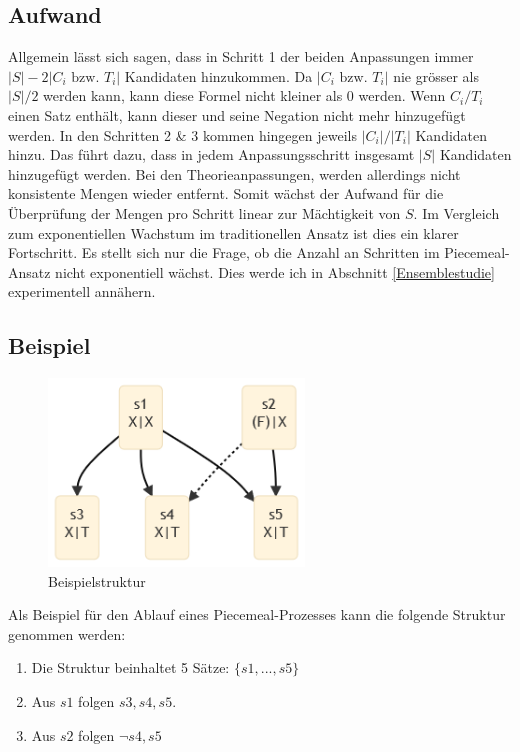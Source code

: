 \documentclass{article}
\begin{document}
\subsection{Aufwand}
Allgemein lässt sich sagen, dass in Schritt 1 der beiden Anpassungen immer $\lvert S \rvert - 2\lvert C_i \text{ bzw. } T_i \rvert$ Kandidaten hinzukommen. Da $\lvert C_i \text{ bzw. } T_i \rvert$ nie grösser als $\lvert S \rvert/2$ werden kann, kann diese Formel nicht kleiner als 0 werden. Wenn $C_i/T_i$ einen Satz enthält, kann dieser und seine Negation nicht mehr hinzugefügt werden. In den Schritten 2 \& 3 kommen hingegen jeweils $\lvert C_i \rvert / \lvert T_i \rvert$ Kandidaten hinzu. Das führt dazu, dass in jedem Anpassungsschritt insgesamt $\lvert S \rvert$ Kandidaten hinzugefügt werden. Bei den Theorieanpassungen, werden allerdings nicht konsistente Mengen wieder entfernt. Somit wächst der Aufwand für die Überprüfung der Mengen pro Schritt linear zur Mächtigkeit von $S$. Im Vergleich zum exponentiellen Wachstum im traditionellen Ansatz ist dies ein klarer Fortschritt. Es stellt sich nur die Frage, ob die Anzahl an Schritten im Piecemeal-Ansatz nicht exponentiell wächst. Dies werde ich in Abschnitt \ref{Ensemblestudie} experimentell annähern.

\subsection{Beispiel}
\begin{figure}[ht]
  \centering
  \includegraphics[width=\textwidth,height=5cm,keepaspectratio]{images/reduced_classical.png}
  \caption{Beispielstruktur\label{fig:classset-initial1}}
\end{figure}

 Als Beispiel für den Ablauf eines Piecemeal-Prozesses kann die folgende Struktur genommen werden:
 \begin{enumerate}
     \item Die Struktur beinhaltet 5 Sätze: $\{s1,...,s5\}$
     \item Aus $s1$ folgen $s3, s4, s5$.
     \item Aus $s2$ folgen $\neg s4, s5$
 \end{enumerate}
 
\end{document}

